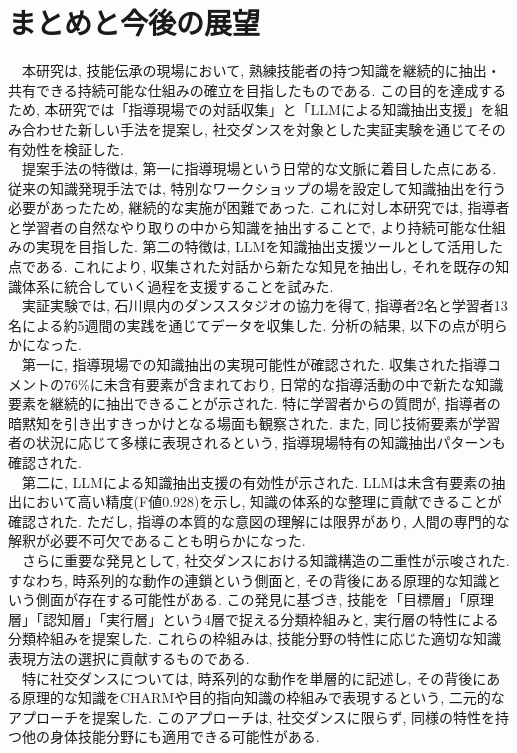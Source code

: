 \chapter{まとめと今後の展望}

　本研究は, 技能伝承の現場において, 熟練技能者の持つ知識を継続的に抽出・共有できる持続可能な仕組みの確立を目指したものである. この目的を達成するため, 本研究では「指導現場での対話収集」と「LLMによる知識抽出支援」を組み合わせた新しい手法を提案し, 社交ダンスを対象とした実証実験を通じてその有効性を検証した.\\
　提案手法の特徴は, 第一に指導現場という日常的な文脈に着目した点にある. 従来の知識発現手法では, 特別なワークショップの場を設定して知識抽出を行う必要があったため, 継続的な実施が困難であった. これに対し本研究では, 指導者と学習者の自然なやり取りの中から知識を抽出することで, より持続可能な仕組みの実現を目指した. 第二の特徴は, LLMを知識抽出支援ツールとして活用した点である. これにより, 収集された対話から新たな知見を抽出し, それを既存の知識体系に統合していく過程を支援することを試みた.\\
　実証実験では, 石川県内のダンススタジオの協力を得て, 指導者2名と学習者13名による約5週間の実践を通じてデータを収集した. 分析の結果, 以下の点が明らかになった.\\
　第一に, 指導現場での知識抽出の実現可能性が確認された. 収集された指導コメントの76\%に未含有要素が含まれており, 日常的な指導活動の中で新たな知識要素を継続的に抽出できることが示された. 特に学習者からの質問が, 指導者の暗黙知を引き出すきっかけとなる場面も観察された. また, 同じ技術要素が学習者の状況に応じて多様に表現されるという, 指導現場特有の知識抽出パターンも確認された.\\
　第二に, LLMによる知識抽出支援の有効性が示された. LLMは未含有要素の抽出において高い精度(F値0.928)を示し, 知識の体系的な整理に貢献できることが確認された. ただし, 指導の本質的な意図の理解には限界があり, 人間の専門的な解釈が必要不可欠であることも明らかになった.\\
　さらに重要な発見として, 社交ダンスにおける知識構造の二重性が示唆された. すなわち, 時系列的な動作の連鎖という側面と, その背後にある原理的な知識という側面が存在する可能性がある. この発見に基づき, 技能を「目標層」「原理層」「認知層」「実行層」という4層で捉える分類枠組みと, 実行層の特性による分類枠組みを提案した. これらの枠組みは, 技能分野の特性に応じた適切な知識表現方法の選択に貢献するものである.\\
　特に社交ダンスについては, 時系列的な動作を単層的に記述し, その背後にある原理的な知識をCHARMや目的指向知識の枠組みで表現するという, 二元的なアプローチを提案した. このアプローチは, 社交ダンスに限らず, 同様の特性を持つ他の身体技能分野にも適用できる可能性がある.\\
